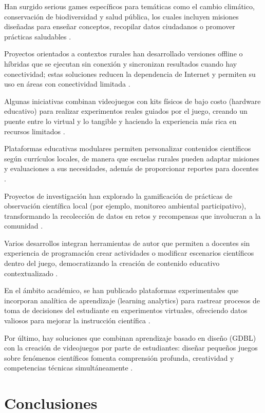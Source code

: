 \begin{enumerate}
    Han surgido serious games específicos para temáticas como el cambio climático, conservación de biodiversidad y salud pública, los cuales incluyen misiones diseñadas para enseñar conceptos, recopilar datos ciudadanos o promover prácticas saludables \cite{}.

    Proyectos orientados a contextos rurales han desarrollado versiones offline o híbridas que se ejecutan sin conexión y sincronizan resultados cuando hay conectividad; estas soluciones reducen la dependencia de Internet y permiten su uso en áreas con conectividad limitada \cite{}.

    Algunas iniciativas combinan videojuegos con kits físicos de bajo costo (hardware educativo) para realizar experimentos reales guiados por el juego, creando un puente entre lo virtual y lo tangible y haciendo la experiencia más rica en recursos limitados \cite{}.

    Plataformas educativas modulares permiten personalizar contenidos científicos según currículos locales, de manera que escuelas rurales pueden adaptar misiones y evaluaciones a sus necesidades, además de proporcionar reportes para docentes \cite{}.

    Proyectos de investigación han explorado la gamificación de prácticas de observación científica local (por ejemplo, monitoreo ambiental participativo), transformando la recolección de datos en retos y recompensas que involucran a la comunidad \cite{}.

    Varios desarrollos integran herramientas de autor que permiten a docentes sin experiencia de programación crear actividades o modificar escenarios científicos dentro del juego, democratizando la creación de contenido educativo contextualizado \cite{}.

    En el ámbito académico, se han publicado plataformas experimentales que incorporan analítica de aprendizaje (learning analytics) para rastrear procesos de toma de decisiones del estudiante en experimentos virtuales, ofreciendo datos valiosos para mejorar la instrucción científica \cite{}.

    Por último, hay soluciones que combinan aprendizaje basado en diseño (GDBL) con la creación de videojuegos por parte de estudiantes: diseñar pequeños juegos sobre fenómenos científicos fomenta comprensión profunda, creatividad y competencias técnicas simultáneamente \cite{}.
\end{enumerate}

\section{Conclusiones}